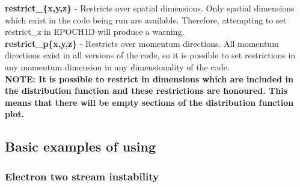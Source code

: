 \documentclass[12pt,a4paper]{article}
\newcommand{\emphtext}{\color{warwickdark} \fontfamily{phv}\selectfont\large\bf}
\newcommand{\EPOCH}{{\color{warwickdark}\fontfamily{phv}\selectfont{EPOCH}}}
\begin{document}
{\emphtext restrict\_\{x,y,z\}} - Restricts over spatial dimensions. Only
spatial dimensions which exist in the code being run are available. Therefore,
attempting to set restrict\_z in EPOCH1D will produce a warning.\\

{\emphtext restrict\_p\{x,y,z\}} - Restricts over momentum directions. All
momentum directions exist in all versions of the code, so it is possible to set
restrictions in any momentum dimension in any dimensionality of the code.\\

{\emphtext NOTE: It is possible to restrict in dimensions which are included in
the distribution function and these restrictions are honoured. This means that
there will be empty sections of the distribution function plot.}

\subsection{Basic examples of using {\EPOCH}}

\subsubsection{Electron two stream instability}
\end{document}
